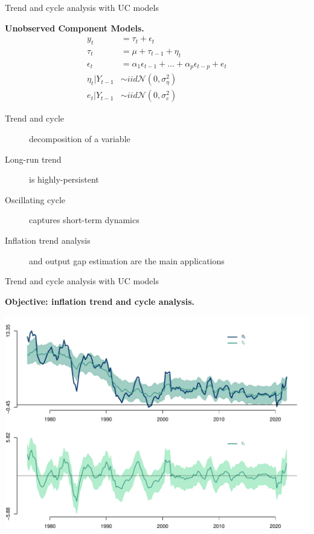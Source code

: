 \documentclass[notes,blackandwhite,mathsans]{beamer}
\begin{document}
\begin{frame}{Trend and cycle analysis with UC models}

\bigskip\textbf{Unobserved Component Models.}
\begin{align*}
y_t &= \tau_t + \epsilon_t\\[1ex]
\tau_t &= \mu + \tau_{t-1} + \eta_t \\[1ex]
\epsilon_t &= \alpha_1 \epsilon_{t-1} + \dots +  \alpha_p \epsilon_{t-p} + e_t \\[1ex]
\eta_t|Y_{t-1} &\sim iid\mathcal{N}\left(0,\sigma_\eta^2\right)\\[1ex]
e_t |Y_{t-1} &\sim iid\mathcal{N}\left(0,\sigma_e^2\right)
\end{align*}

\begin{description}
\item[Trend and cycle] {\color{mcxs2}decomposition of a variable} 
\item[Long-run trend] {\color{mcxs2}is highly-persistent} 
\item[Oscillating cycle] {\color{mcxs2}captures short-term dynamics} 
\item[Inflation trend analysis] {\color{mcxs2}and output gap estimation are the main applications}
\end{description}
\end{frame}







\begin{frame}{Trend and cycle analysis with UC models}

\bigskip\textbf{Objective: inflation trend and cycle analysis.}

\centering
\includegraphics[scale=0.4]{grphs/06trend}
\end{frame}
\end{document}
